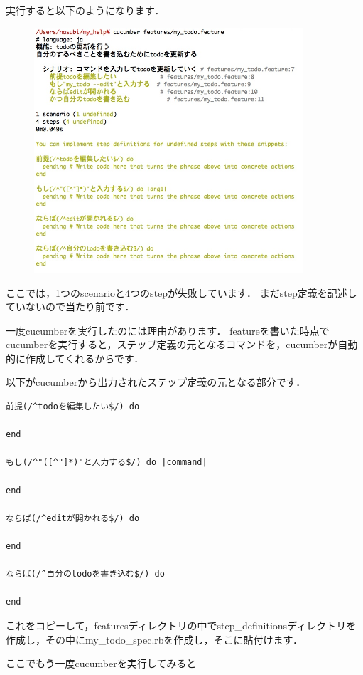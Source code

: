 実行すると以下のようになります．

\begin{figure}[htbp]\begin{center}
\includegraphics[width=10cm,bb= 0 0 737 453]{../figs/./cucumber1.jpg}
\caption{}
\label{default}\end{center}\end{figure}
ここでは，1つのscenarioと4つのstepが失敗しています．
まだstep定義を記述していないので当たり前です．

一度cucumberを実行したのには理由があります．
featureを書いた時点でcucumberを実行すると，ステップ定義の元となるコマンドを，cucumberが自動的に作成してくれるからです．

以下がcucumberから出力されたステップ定義の元となる部分です．
\begin{lstlisting}[style=customCsh]
前提(/^todoを編集したい$/) do

end

もし(/^"([^"]*)"と入力する$/) do |command|

end

ならば(/^editが開かれる$/) do
  
end

ならば(/^自分のtodoを書き込む$/) do

end
\end{lstlisting}
これをコピーして，featuresディレクトリの中でstep\_definitionsディレクトリを作成し，その中にmy\_todo\_spec.rbを作成し，そこに貼付けます．

ここでもう一度cucumberを実行してみると

